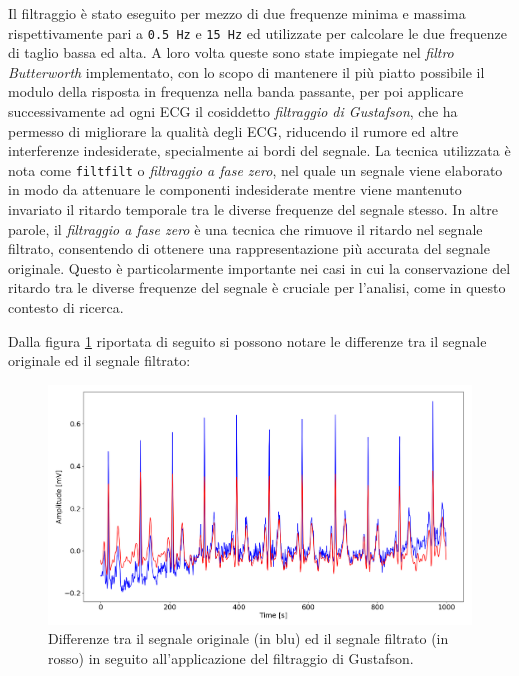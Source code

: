 \documentclass[12pt,italian]{report}
\begin{document}
Il filtraggio è stato eseguito per mezzo di due frequenze minima e massima rispettivamente pari a \texttt{0.5 Hz} e \texttt{15 Hz} ed utilizzate per calcolare le due frequenze di taglio bassa ed alta. A loro volta queste sono state impiegate nel \textit{filtro Butterworth} implementato, con lo scopo di mantenere il più piatto possibile il modulo della risposta in frequenza nella banda passante, per poi applicare successivamente ad ogni ECG il cosiddetto \textit{filtraggio di Gustafson}, che ha permesso di migliorare la qualità degli ECG, riducendo il rumore ed altre interferenze indesiderate, specialmente ai bordi del segnale. La tecnica utilizzata è nota come \texttt{filtfilt} o \textit{filtraggio a fase zero}, nel quale un segnale viene elaborato in modo da attenuare le componenti indesiderate mentre viene mantenuto invariato il ritardo temporale tra le diverse frequenze del segnale stesso. In altre parole, il \textit{filtraggio a fase zero} è una tecnica che rimuove il ritardo nel segnale filtrato, consentendo di ottenere una rappresentazione più accurata del segnale originale. Questo è particolarmente importante nei casi in cui la conservazione del ritardo tra le diverse frequenze del segnale è cruciale per l'analisi, come in questo contesto di ricerca.

Dalla figura \ref{fig:filtraggio} riportata di seguito si possono notare le differenze tra il segnale originale ed il segnale filtrato:

\begin{figure}[H]
    \centering
    \includegraphics[width=1\textwidth]{immagini/filtraggio.png}
    \captionsetup{justification=centering}
    \caption{Differenze tra il segnale originale (in blu) ed il segnale filtrato (in rosso) in seguito all'applicazione del filtraggio di Gustafson.}
    \label{fig:filtraggio}
\end{figure}
\end{document}
